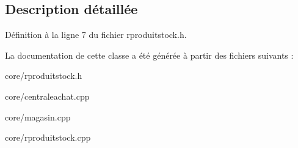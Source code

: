 \subsection{Description détaillée}


Définition à la ligne 7 du fichier rproduitstock.h.



La documentation de cette classe a été générée à partir des fichiers suivants :\begin{DoxyCompactItemize}
\item 
core/rproduitstock.h\item 
core/centraleachat.cpp\item 
core/magasin.cpp\item 
core/rproduitstock.cpp\end{DoxyCompactItemize}
